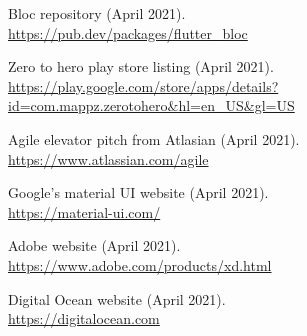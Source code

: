 \documentclass{article}
\begin{document}
\begin{multicols}{2}
\begin{thebibliography}{9}
  Bloc repository (April 2021).\\
  \url{https://pub.dev/packages/flutter\_bloc}

  Zero to hero play store listing (April 2021).\\
  \url{https://play.google.com/store/apps/details?id=com.mappz.zerotohero&hl=en_US&gl=US}

  Agile elevator pitch from Atlasian (April 2021).\\
  \url{https://www.atlassian.com/agile}

  Google's material UI website (April 2021).\\
  \url{https://material-ui.com/}
  
  Adobe website (April 2021).\\
  \url{https://www.adobe.com/products/xd.html}

  Digital Ocean website (April 2021).\\
  \url{https://digitalocean.com}
\end{thebibliography}


\newpage
\end{multicols}
\end{document}
